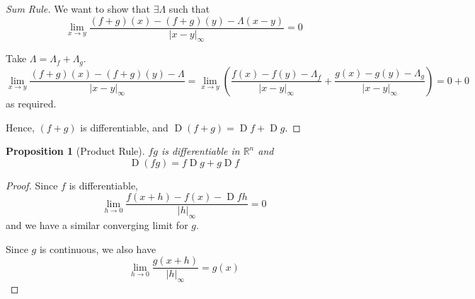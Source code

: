 \documentclass[letterpaper,11pt]{article}
\newtheorem{prop}{Proposition}
\DeclareMathOperator{\D}{D}
\newcommand{\R}{\mathbb{R}}
\newcommand{\norm}[1]{\left|#1\right|}
\newcommand{\inftynorm}[1]{\norm{#1}_\infty}
\newcommand{\parens}[1]{\left(#1\right)}
\begin{document}
\begin{enumerate}
\begin{proof}[Sum Rule]
            We want to show that $\exists \Lambda$ such that
            \begin{equation*}
                \lim_{x \to y} {
                    \frac{(f + g)(x) - (f + g)(y) - \Lambda (x - y)}{
                        \inftynorm{x - y}
                    }
                }
                = 0
            \end{equation*}

            Take $\Lambda = \Lambda_f + \Lambda_g$.
            \begin{equation*}
                \lim_{x \to y} {
                    \frac{(f + g)(x) - (f + g)(y) - \Lambda} {
                        \inftynorm{x - y}
                    }
                }
                = \lim_{x \to y} \parens{
                    \frac{f(x) - f(y) - \Lambda_f} {
                        \inftynorm{x - y}
                    }
                    +
                    \frac{g(x) - g(y) - \Lambda_g} {
                        \inftynorm{x - y}
                    }
                }
                = 0 + 0
            \end{equation*}
            as required.

            Hence, $(f + g)$ is differentiable, and
            $\D{(f + g)} = \D{f} + \D{g}$.
        \end{proof}

        \begin{prop}[Product Rule]
            $fg$ is differentiable in $\R^n$ and
            \begin{equation*}
                \D{(fg)} = f \D{g} + g \D{f}
            \end{equation*}
        \end{prop}

        \begin{proof}
            Since $f$ is differentiable,
            \begin{equation*}
                \lim_{h \to 0} {
                    \frac{f(x+h) - f(x) - \D{f}h}{\inftynorm{h}}
                }
                = 0
            \end{equation*}
            and we have a similar converging limit for $g$.

            Since $g$ is continuous, we also have
            \begin{equation*}
                \lim_{h \to 0} \frac{g(x + h)}{\inftynorm{h}} = g(x)
            \end{equation*}


\end{proof}
\end{enumerate}
\end{document}
